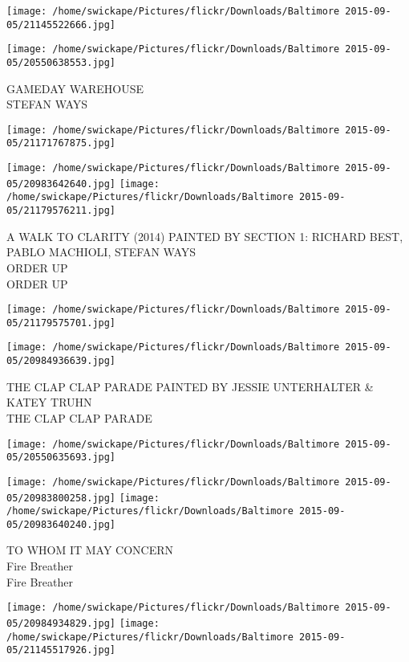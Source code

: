 \documentclass[10pt,letterpaper]{article}
\begin{document}
\texttt{[image: /home/swickape/Pictures/flickr/Downloads/Baltimore 2015-09-05/21145522666.jpg]}

\vspace{0.25in}
\texttt{[image: /home/swickape/Pictures/flickr/Downloads/Baltimore 2015-09-05/20550638553.jpg]}

GAMEDAY WAREHOUSE\\
STEFAN WAYS\\
\pagebreak

\texttt{[image: /home/swickape/Pictures/flickr/Downloads/Baltimore 2015-09-05/21171767875.jpg]}

\vspace{0.25in}
\texttt{[image: /home/swickape/Pictures/flickr/Downloads/Baltimore 2015-09-05/20983642640.jpg]}
\texttt{[image: /home/swickape/Pictures/flickr/Downloads/Baltimore 2015-09-05/21179576211.jpg]}

A WALK TO CLARITY (2014) PAINTED BY SECTION 1: RICHARD BEST, PABLO MACHIOLI, STEFAN WAYS\\
ORDER UP\\
ORDER UP\\
\pagebreak

\texttt{[image: /home/swickape/Pictures/flickr/Downloads/Baltimore 2015-09-05/21179575701.jpg]}

\vspace{0.25in}
\texttt{[image: /home/swickape/Pictures/flickr/Downloads/Baltimore 2015-09-05/20984936639.jpg]}

THE CLAP CLAP PARADE PAINTED BY JESSIE UNTERHALTER \& KATEY TRUHN\\
THE CLAP CLAP PARADE\\
\pagebreak

\texttt{[image: /home/swickape/Pictures/flickr/Downloads/Baltimore 2015-09-05/20550635693.jpg]}

\vspace{0.25in}
\texttt{[image: /home/swickape/Pictures/flickr/Downloads/Baltimore 2015-09-05/20983800258.jpg]}
\texttt{[image: /home/swickape/Pictures/flickr/Downloads/Baltimore 2015-09-05/20983640240.jpg]}

TO WHOM IT MAY CONCERN\\
Fire Breather\\
Fire Breather\\
\pagebreak

\texttt{[image: /home/swickape/Pictures/flickr/Downloads/Baltimore 2015-09-05/20984934829.jpg]}
\texttt{[image: /home/swickape/Pictures/flickr/Downloads/Baltimore 2015-09-05/21145517926.jpg]}
\end{document}
